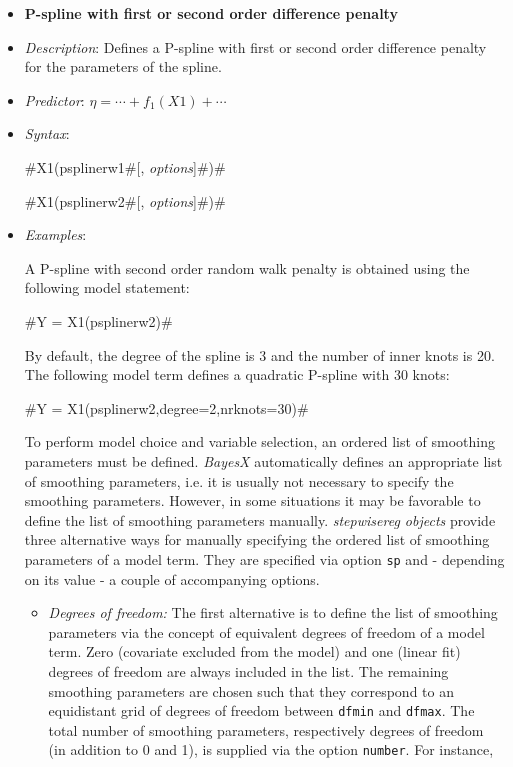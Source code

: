 \begin{itemize}
\item[] {\bf\sffamily P-spline with first or second order difference penalty}
\label{psplines_stepwise}

\item[] {\em Description}: Defines a P-spline with first or second
order difference penalty for the parameters of the spline.
\item[] {\em Predictor}: $\eta =  \cdots + f_1(X1) + \cdots$
\item[] {\em Syntax}:

#X1(psplinerw1#[, {\em options}]#)#

#X1(psplinerw2#[, {\em options}]#)#
\item[] {\em Examples}:

A P-spline with second order random walk penalty is
obtained using the following model statement:

#Y = X1(psplinerw2)#

By default, the degree of the spline is 3 and the number of inner
knots is 20. The following model term defines a quadratic P-spline
with 30 knots:

#Y = X1(psplinerw2,degree=2,nrknots=30)#

To perform model choice and variable selection, an ordered list of smoothing parameters must be defined. {\em BayesX} automatically defines an appropriate list of smoothing
parameters, i.e. it is usually not necessary to  specify the smoothing parameters. However, in some situations it may be
favorable to define the list of smoothing parameters manually. {\em stepwisereg objects} provide three alternative ways for
manually specifying the ordered list of smoothing parameters of a model term. They are specified via option {\tt sp} and -
depending on its value - a couple of accompanying options.

\begin{itemize}
\item {\em Degrees of freedom:} The first alternative is to define the list of  smoothing parameters via the concept of
equivalent degrees of freedom of a model term. Zero (covariate excluded from the model) and one (linear fit)
degrees of freedom are always included in the list. The remaining smoothing parameters  are chosen such that they
correspond to an equidistant grid of degrees of freedom between {\tt dfmin} and {\tt dfmax}. The total
number of smoothing parameters, respectively degrees of freedom (in addition to 0 and 1), is supplied via the option {\tt number}.
For instance,


\end{itemize}
\end{itemize}
